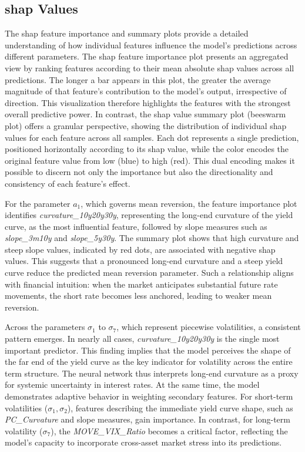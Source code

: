 \subsection{\ac{shap} Values}
The \ac{shap} feature importance and summary plots provide a detailed understanding of how individual features influence the model's predictions across different parameters. The \ac{shap} feature importance plot presents an aggregated view by ranking features according to their mean absolute \ac{shap} values across all predictions. The longer a bar appears in this plot, the greater the average magnitude of that feature's contribution to the model's output, irrespective of direction. This visualization therefore highlights the features with the strongest overall predictive power. In contrast, the \ac{shap} value summary plot (beeswarm plot) offers a granular perspective, showing the distribution of individual \ac{shap} values for each feature across all samples. Each dot represents a single prediction, positioned horizontally according to its \ac{shap} value, while the color encodes the original feature value from low (blue) to high (red). This dual encoding makes it possible to discern not only the importance but also the directionality and consistency of each feature's effect.

For the parameter \(a_1\), which governs mean reversion, the feature importance plot identifies \textit{curvature\_10y20y30y}, representing the long-end curvature of the yield curve, as the most influential feature, followed by slope measures such as \textit{slope\_3m10y} and \textit{slope\_5y30y}. The summary plot shows that high curvature and steep slope values, indicated by red dots, are associated with negative \ac{shap} values. This suggests that a pronounced long-end curvature and a steep yield curve reduce the predicted mean reversion parameter. Such a relationship aligns with financial intuition: when the market anticipates substantial future rate movements, the short rate becomes less anchored, leading to weaker mean reversion.

Across the parameters \(\sigma_1\) to \(\sigma_7\), which represent piecewise volatilities, a consistent pattern emerges. In nearly all cases, \textit{curvature\_10y20y30y} is the single most important predictor. This finding implies that the model perceives the \ac{shap}e of the far end of the yield curve as the key indicator for volatility across the entire term structure. The neural network thus interprets long-end curvature as a proxy for systemic uncertainty in interest rates. At the same time, the model demonstrates adaptive behavior in weighting secondary features. For short-term volatilities (\(\sigma_1, \sigma_2\)), features describing the immediate yield curve \ac{shap}e, such as \textit{PC\_Curvature} and slope measures, gain importance. In contrast, for long-term volatility (\(\sigma_7\)), the \textit{MOVE\_VIX\_Ratio} becomes a critical factor, reflecting the model's capacity to incorporate cross-asset market stress into its predictions.

